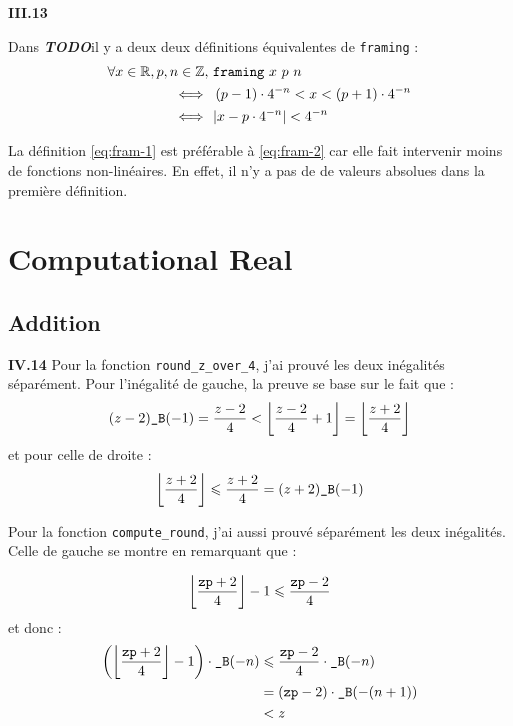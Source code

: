 \documentclass[9pt,a4paper,twocolumn]{article}
\theoremstyle{definition}
\DeclarePairedDelimiter\floor{\lfloor}{\rfloor}
\newcommand{\Z}{\ensuremath\mathbb{Z}}
\newcommand{\R}{\ensuremath\mathbb{R}}
\newcommand{\B}{\texttt{\_B}}
\renewcommand{\leq}{\leqslant}
\newcommand{\TODO}{{\color{red}\textbf{\textit{TODO}}}}
\newenvironment{code}[1][ocaml]{%
\newgeometry{textwidth = 0.8\textwidth}
\VerbatimEnvironment\begin{verbatim}%
}{%
\end{verbatim}
\restoregeometry
}
\begin{document}
\textbf{III.13}

Dans \TODO il y a deux deux définitions équivalentes de \texttt{framing} :
\begin{align}
\forall x \in \R, p, n \in \Z,\  \nonumber
	& \texttt{framing}\ x\ p\ n \\
\Longleftrightarrow \ \
	& \left( p-1 \right) \cdot 4^{-n}
		< x <
		\left( p+1 \right) \cdot 4^{-n}
	\label{eq:fram-1} \\
\Longleftrightarrow \ \
	& |x-p\cdot 4^{-n}| < 4^{-n}
	\label{eq:fram-2}
\end{align}

La définition \ref{eq:fram-1} est préférable à \ref{eq:fram-2} car elle fait
intervenir moins de fonctions non-linéaires.
En effet, il n'y a pas de de valeurs absolues dans la première définition.

\section{Computational Real}

\subsection{Addition}


\textbf{IV.14}
Pour la fonction \texttt{round\_z\_over\_4}, j'ai prouvé les deux inégalités
séparément. Pour l'inégalité de gauche, la preuve se  base sur le fait que :
$$
	(z-2)\B(-1)
	= \frac{z-2}{4}
	< \floor*{ \frac{z - 2}{4} + 1 }
	= \floor*{ \frac{z+2}{4} }
$$
et pour celle de droite :
$$
\floor*{ \frac{z + 2}{4} }
	\leq \frac{z+2}{4}
	= (z + 2)\B(-1)
$$


Pour la fonction \texttt{compute\_round}, j'ai aussi prouvé séparément les deux
inégalités.
Celle de gauche se montre en remarquant que :

$$
\floor*{\frac{\texttt{zp} + 2}{4}} - 1
\leq \frac{\texttt{zp} -2}{4}
$$
et donc :
\begin{align*}
\left(\floor*{\frac{\texttt{zp} + 2}{4}} - 1\right) \cdot \B(-n)
  &\leq \frac{\texttt{zp} -2}{4} \cdot \B(-n)\\
  &= (\texttt{zp} -2)\cdot \B(-(n+1))\\
  &< z
\end{align*}
\end{document}
